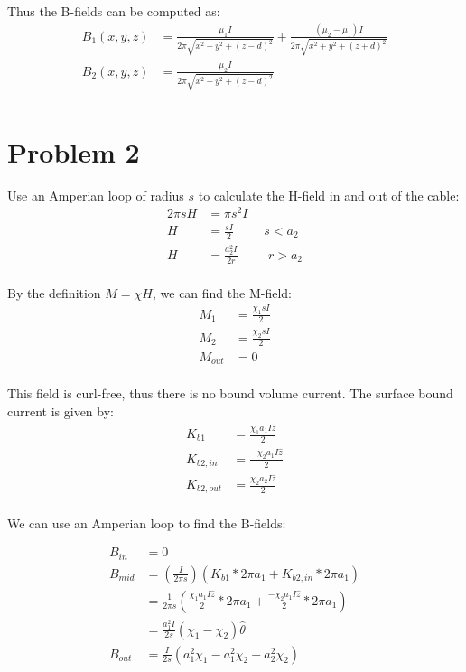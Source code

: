 \documentclass[10pt]{article} %
\begin{document}
Thus the B-fields can be computed as:\\

\begin{align*}
  B_1(x,y,z) &= \frac{\mu_1I}{2\pi\sqrt{x^2+y^2+(z-d)^2}} + \frac{(\mu_2-\mu_1)I}{2\pi\sqrt{x^2+y^2+(z+d)^2}}\\
  B_2(x,y,z) &= \frac{\mu_2I}{2\pi\sqrt{x^2+y^2+(z-d)^2}}\\
\end{align*}


\section{Problem 2}
Use an Amperian loop of radius $s$ to calculate the H-field in and out of the cable:\\

\begin{align*}
  2\pi sH &= \pi s^2 I\\
  H &= \frac{sI}{2} \hspace{1cm} s<a_2\\
  H &= \frac{a_2^2I}{2r} \hspace{1cm} r>a_2\\
\end{align*}

By the definition $M=\chi H$, we can find the M-field:\\

\begin{align*}
  M_1 &= \frac{\chi_1 sI}{2}\\
  M_2 &= \frac{\chi_2 sI}{2}\\
  M_{out} &= 0\\
\end{align*}

This field is curl-free, thus there is no bound volume current. The surface bound current is given by:\\

\begin{align*}
  K_{b1} &= \frac{\chi_1 a_1 I\hat{z}}{2}\\
  K_{b2,in} &= \frac{-\chi_2 a_1 I\hat{z}}{2}\\
  K_{b2,out} &= \frac{\chi_2 a_2 I\hat{z}}{2}\\
\end{align*}

We can use an Amperian loop to find the B-fields:

\begin{align*}
  B_{in} &= 0\\
  B_{mid} &= \left(\frac{I}{2\pi s}\right)\left(K_{b1}*2\pi a_1 + K_{b2,in}*2\pi a_1\right)\\
  &= \frac{1}{2\pi s}\left(\frac{\chi_1 a_1 I\hat{z}}{2} * 2\pi a_1 + \frac{-\chi_2 a_1 I \hat{z}}{2}*2\pi a_1\right)\\
  &= \frac{a_1^2I}{2s}\left(\chi_1-\chi_2\right)\hat{\theta}\\
  B_{out} &= \frac{I}{2s}\left(a_1^2\chi_1 - a_1^2\chi_2 + a_2^2\chi_2\right)\\
\end{align*}
\end{document}
